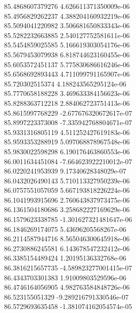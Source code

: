 {85.4868607379276 4.626611371350009e-06 \\
85.4956829262237 4.388204160932219e-06 \\
85.5094041220982 3.506681650833343e-06 \\
85.5282232663885 2.540127752581611e-06 \\
85.5454859025585 5.166619303054176e-06 \\
85.5679453079938 6.818744623160455e-06 \\
85.6053572451137 5.775830686616246e-06 \\
85.6568692893443 4.711099791165907e-06 \\
85.720302515374 4.188243565295124e-06 \\
85.7770658188228 3.469633384156623e-06 \\
85.8288363712218 2.884062723751413e-06 \\
85.8615997768229 -2.677676320672617e-07 \\
85.8997223373008 -7.335942768804671e-07 \\
85.9331316805119 4.511252427619183e-06 \\
85.9593353288919 5.097068878967548e-06 \\
85.9830022598298 6.190176463860553e-06 \\
86.0011634451084 -7.664623922210012e-07 \\
86.0220241953939 9.17340628348029e-07 \\
86.0432026490143 5.710113327950239e-06 \\
86.0757551057059 5.667193818226224e-06 \\
86.1041993915696 2.760643837973475e-06 \\
86.1361504180686 3.258682227169629e-06 \\
86.1579623338785 -1.301627321481647e-06 \\
86.1846269174075 5.43696205568267e-06 \\
86.2114587944716 8.565046300645918e-06 \\
86.2730886245581 6.143678547232412e-06 \\
86.3385154489424 1.20195136332768e-06 \\
86.3816215657735 -4.589823277001415e-07 \\
86.4343703301383 1.91009803529596e-06 \\
86.4746164056905 4.982763584848726e-06 \\
86.523155051329 -9.289216791330546e-07 \\
86.5729693635458 -1.381074162054574e-05 \\
}
